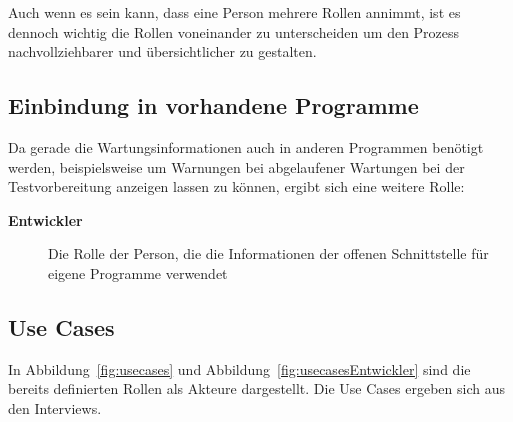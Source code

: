 Auch wenn es sein kann, dass eine Person mehrere Rollen annimmt, ist es dennoch 
wichtig die Rollen voneinander zu unterscheiden um den Prozess nachvollziehbarer
und übersichtlicher zu gestalten.

\subsection{Einbindung in vorhandene Programme}
Da gerade die Wartungsinformationen auch in anderen Programmen benötigt werden, 
beispielsweise um Warnungen bei abgelaufener Wartungen bei der Testvorbereitung
anzeigen lassen zu können, ergibt sich eine weitere Rolle:

\begin{description}
    \item[\textbf{Entwickler}] Die Rolle der Person, die die Informationen der
    offenen Schnittstelle für eigene Programme verwendet
\end{description}

\subsection{Use Cases}
In Abbildung~\ref{fig:usecases} und Abbildung~\ref{fig:usecasesEntwickler} sind 
die bereits definierten Rollen als Akteure dargestellt.
Die Use Cases ergeben sich aus den Interviews.

